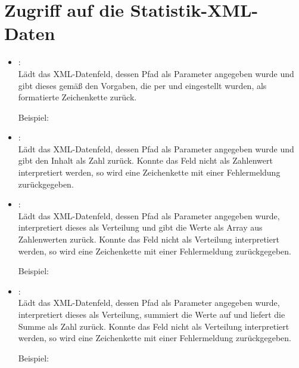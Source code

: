 \section{Zugriff auf die Statistik-XML-Daten}

\begin{itemize}
	
\item
{}:\\
Lädt das XML-Datenfeld, dessen Pfad als Parameter angegeben wurde und gibt dieses gemäß den Vorgaben,
die per  und  eingestellt wurden,
als formatierte Zeichenkette zurück.
	
Beispiel:\\
  
\item
{}:\\
Lädt das XML-Datenfeld, dessen Pfad als Parameter angegeben wurde und gibt den Inhalt als Zahl zurück.
Konnte das Feld nicht als Zahlenwert interpretiert werden, so wird eine Zeichenkette mit einer Fehlermeldung
zurückgegeben.  
	
\item
{}:\\
Lädt das XML-Datenfeld, dessen Pfad als Parameter angegeben wurde, interpretiert dieses als Verteilung
und gibt die Werte als Array aus Zahlenwerten zurück.
Konnte das Feld nicht als Verteilung interpretiert werden, so wird eine Zeichenkette mit einer Fehlermeldung
zurückgegeben.
	
Beispiel:\\
  
\item
{}:\\
Lädt das XML-Datenfeld, dessen Pfad als Parameter angegeben wurde, interpretiert dieses als Verteilung,
summiert die Werte auf und liefert die Summe als Zahl zurück.
Konnte das Feld nicht als Verteilung interpretiert werden, so wird eine Zeichenkette mit einer Fehlermeldung
zurückgegeben.
	
Beispiel:\\


\end{itemize}
